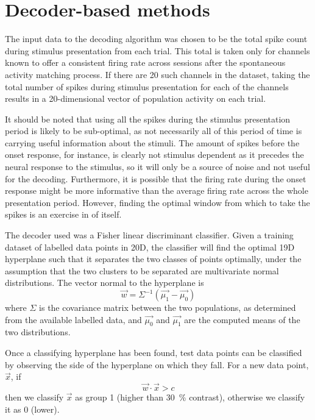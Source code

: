 \section{Decoder-based methods}
\label{sec:dec-meth-lin}

The input data to the decoding algorithm was chosen to be the total spike count during stimulus presentation from each trial.
This total is taken only for channels known to offer a consistent firing rate across sessions after the spontaneous activity matching process.
If there are 20 such channels in the dataset, taking the total number of spikes during stimulus presentation for each of the channels results in a 20-dimensional vector of population activity on each trial.

It should be noted that using all the spikes during the stimulus presentation period is likely to be sub-optimal, as not necessarily all of this period of time is carrying useful information about the stimuli.
The amount of spikes before the onset response, for instance, is clearly not stimulus dependent as it precedes the neural response to the stimulus, so it will only be a source of noise and  not useful for the decoding.
Furthermore, it is possible that the firing rate during the onset response might be more informative than the average firing rate across the whole presentation period.
However, finding the optimal window from which to take the spikes is an exercise in of itself.

The decoder used was a Fisher linear discriminant classifier.
Given a training dataset of labelled data points in 20D, the classifier will find the optimal 19D hyperplane such that it separates the two classes of points optimally, under the assumption that the two clusters to be separated are multivariate normal distributions.
The vector normal to the hyperplane is 
\begin{equation}
\vec{w} = \Sigma^{-1}\left(\vec{\mu_1}-\vec{\mu_0}\right)
\end{equation}
where $\Sigma$ is the covariance matrix between the two populations, as determined from the available labelled data, and $\vec{\mu_0}$ and $\vec{\mu_1}$ are the computed means of the two distributions.

Once a classifying hyperplane has been found, test data points can be classified by observing the side of the hyperplane on which they fall.
For a new data point, $\vec{x}$,  if
\begin{equation}
\vec{w}\cdot\vec{x}>c
\end{equation}
then we classify $\vec{x}$ as group 1 (higher than \SI{30}{\percent} contrast), otherwise we classify it as 0 (lower).

